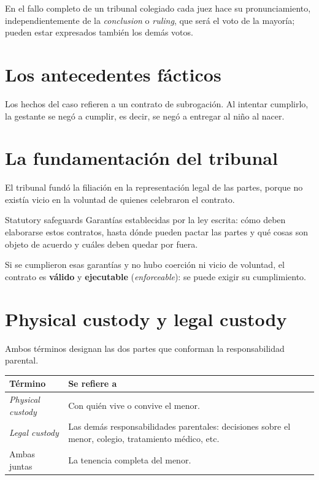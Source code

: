 \documentclass[12pt,oneside]{book}
\begin{document}
En el fallo completo de un tribunal colegiado cada juez hace su pronunciamiento, independientemente de la \textit{conclusion} o \textit{ruling}, que será el voto de la mayoría; pueden estar expresados también los demás votos.

\section{Los antecedentes fácticos}

Los hechos del caso refieren a un contrato de subrogación. Al intentar cumplirlo, la gestante se negó a cumplir, es decir, se negó a entregar al niño al nacer.

\section{La fundamentación del tribunal}

El tribunal fundó la filiación en la representación legal de las partes, porque no existía vicio en la voluntad de quienes celebraron el contrato.

\begin{definition}{Statutory safeguards}
Garantías establecidas por la ley escrita: cómo deben elaborarse estos contratos, hasta dónde pueden pactar las partes y qué cosas son objeto de acuerdo y cuáles deben quedar por fuera.
\end{definition}

Si se cumplieron esas garantías y no hubo coerción ni vicio de voluntad, el contrato es \textbf{válido} y \textbf{ejecutable} (\textit{enforceable}): se puede exigir su cumplimiento.

\section{Physical custody y legal custody}

Ambos términos designan las dos partes que conforman la responsabilidad parental.

\begin{table}[H]
\centering
\begin{tabularx}{\textwidth}{
    >{\raggedright\arraybackslash}p{}
    >{\raggedright\arraybackslash}X
}
\toprule
\textbf{Término} & \textbf{Se refiere a} \\
\midrule
\textit{Physical custody} & Con quién vive o convive el menor. \\
\textit{Legal custody} & Las demás responsabilidades parentales: decisiones sobre el menor, colegio, tratamiento médico, etc. \\
Ambas juntas & La tenencia completa del menor. \\
\bottomrule
\end{tabularx}
\end{table}
\end{document}
